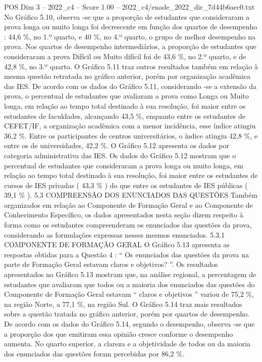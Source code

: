 \begin{textsample}{POS Dim 3 – 2022\_c4 – Score 1.00 – 2022\_c4/enade\_2022\_dir\_7d44b6aec0.txt}
No Gráfico 5.10, observa -se que a proporção de estudantes que consideraram a prova longa ou muito longa foi decrescente em função dos quartos de desempenho : 44,6 \%, no 1.º quarto, e 40 \%, no 4.º quarto, o grupo de melhor desempenho na prova.
Nos quartos de desempenho intermediários, a proporção de estudantes que consideraram a prova Difícil ou Muito difícil foi de 43,6 \%, no 2.º quarto, e de 42,8 \%, no 3.º quarto.
O Gráfico 5.11 traz outros resultados também em relação à mesma questão retratada no gráfico anterior, porém por organização acadêmica das IES.
De acordo com os dados do Gráfico 5.11, considerando -se a extensão da prova, o percentual de estudantes que avaliaram a prova como Longa ou Muito longa, em relação ao tempo total destinado à sua resolução, foi maior entre os estudantes de faculdades, alcançando 43,5 \%, enquanto entre os estudantes de CEFET/IF, a organização acadêmica com a menor incidência, esse índice atingiu 36,2 \%.
Entre os participantes de centros universitários, o índice atingiu 42,8 \%, e entre os de universidades, 42,2 \%.
O Gráfico 5.12 apresenta os dados por categoria administrativa das IES.
Os dados do Gráfico 5.12 mostram que o percentual de estudantes que consideraram a prova longa ou muito longa, em relação ao tempo total destinado à sua resolução, foi maior entre os estudantes de cursos de IES privadas ( 43,3 \% ) do que entre os estudantes de IES públicas ( 39,1 \% ). 5.3 COMPREENSÃO DOS ENUNCIADOS DAS QUESTÕES Também organizados em relação ao Componente de Formação Geral e ao Componente de Conhecimento Específico, os dados apresentados nesta seção dizem respeito à forma como os estudantes compreenderam os enunciados das questões da prova, considerando as formulações expressas nesses mesmos enunciados. 5.3.1 COMPONENTE DE FORMAÇÃO GERAL O Gráfico 5.13 apresenta as respostas obtidas para a Questão 4 : “ Os enunciados das questões da prova na parte de Formação Geral estavam claros e objetivos? ”.
Os resultados apresentados no Gráfico 5.13 mostram que, na análise regional, a percentagem de estudantes que avaliaram que todos ou a maioria dos enunciados das questões do Componente de Formação Geral estavam “ claros e objetivos ” variou de 75,2 \%, na região Norte, a 77,1 \%, na região Sul.
O Gráfico 5.14 traz mais resultados sobre a questão tratada no gráfico anterior, porém por quartos de desempenho.
De acordo com os dados do Gráfico 5.14, segundo o desempenho, observa -se que a proporção dos que emitiram essa opinião cresce conforme o desempenho aumenta.
No quarto superior, a clareza e a objetividade de todos ou da maioria dos enunciados das questões foram percebidas por 86,2 \%.

\end{textsample}
